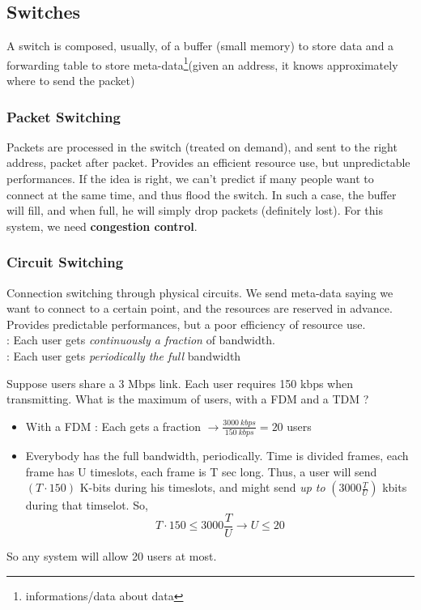 \documentclass[12pt,a4paper]{article}
\begin{document}
\subsection{Switches}
A switch is composed, usually, of a buffer (small memory) to store data and a forwarding table to store meta-data\footnote{informations/data about data}(given an address, it knows approximately where to send the packet)

\subsubsection{Packet Switching}
Packets are processed in the switch (treated on demand), and sent to the right address, packet after packet. Provides an efficient resource use, but unpredictable performances. If the idea is right, we can't predict if many people want to connect at the same time, and thus flood the switch. In such a case, the buffer will fill, and when full, he will simply drop packets (definitely lost). For this system, we need \textbf{congestion control}.	

\subsubsection{Circuit Switching}
Connection switching through physical circuits. We send meta-data saying we want to connect to a certain point, and the resources are reserved in advance. Provides predictable performances, but a poor efficiency of resource use.\\
 : Each user gets \textit{continuously a fraction} of bandwidth.\\
 : Each user gets \textit{periodically the full} bandwidth
\begin{exemple}
	Suppose users share a 3 Mbps link. Each user requires 150 kbps when transmitting. What is the maximum of users, with a FDM and a TDM ?
	\begin{itemize}
		\item With a FDM : Each gets a fraction $\to \frac{3000\ kbps}{150\ kbps} = 20$ users 
		\item Everybody has the full bandwidth, periodically. Time is divided frames, each frame has U timeslots, each frame is T sec long. Thus, a user will send $(T\cdot 150)$ K-bits during his timeslots, and might send \textit{up to} $(3000 \frac{T}{U})$ kbits during that timselot. So, 
		\[T \cdot 150 \leq 3000 \frac{T}{U} \to U \leq 20\]
	\end{itemize}
	So any system will allow 20 users at most.
\end{exemple}
\end{document}
